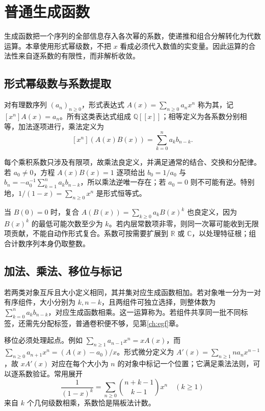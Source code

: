 \documentclass[UTF8,12pt,a4paper,fontset=fandol]{ctexbook}
\begin{document}
\chapter{普通生成函数}
\label{ch:ogf}

生成函数把一个序列的全部信息存入各次幂的系数，使递推和组合分解转化为代数运算。本章使用形式幂级数，不把 $x$ 看成必须代入数值的实变量。因此运算的合法性来自逐系数的有限性，而非解析收敛。

\section{形式幂级数与系数提取}

\begin{definition}
对有理数序列 $(a_n)_{n\ge0}$，形式表达式 $A(x)=\sum_{n\ge0}a_nx^n$ 称为其，记 $[x^n]A(x)=a_n$。所有这类表达式组成 $\mathbb Q[[x]]$；相等定义为各系数分别相等，加法逐项进行，乘法定义为
\[
 [x^n](A(x)B(x))=\sum_{k=0}^n a_kb_{n-k}.
\]
\end{definition}

每个乘积系数只涉及有限项，故乘法良定义，并满足通常的结合、交换和分配律。若 $a_0\ne0$，方程 $A(x)B(x)=1$ 逐项给出 $b_0=1/a_0$ 与 $b_n=-a_0^{-1}\sum_{k=1}^n a_kb_{n-k}$，所以乘法逆唯一存在；若 $a_0=0$ 则不可能有逆。特别地，$1/(1-x)=\sum_{n\ge0}x^n$ 是形式恒等式。

当 $B(0)=0$ 时，复合 $A(B(x))=\sum_{k\ge0}a_kB(x)^k$ 也良定义，因为 $B(x)^k$ 的最低可能次数至少为 $k$。若内层常数项非零，则同一次幂可能收到无限项贡献，不能自动作形式复合。系数可按需要扩展到 $\mathbb R$ 或 $\mathbb C$，以处理特征根；组合计数序列本身仍取整数。

\section{加法、乘法、移位与标记}

若两类对象互斥且大小定义相同，其并集对应生成函数相加。若对象唯一分为一对有序组件，大小分别为 $k,n-k$，且两组件可独立选择，则整体数为 $\sum_{k=0}^n a_kb_{n-k}$，对应生成函数相乘。这一运算称为。若组件共享同一批不同标签，还需先分配标签，普通卷积便不够，见第\ref{ch:egf}章。

移位必须处理起点。例如 $\sum_{n\ge1}a_{n-1}x^n=xA(x)$，而 $\sum_{n\ge0}a_{n+1}x^n=(A(x)-a_0)/x$。形式微分定义为 $A'(x)=\sum_{n\ge1}na_nx^{n-1}$，故 $xA'(x)$ 对应在每个大小为 $n$ 的对象中标记一个位置；它满足乘法法则，可以逐系数验证。常用展开
\begin{equation}
  \frac{1}{(1-x)^k}=\sum_{n\ge0}\binom{n+k-1}{k-1}x^n\quad(k\ge1)
  \label{eq:negative-binomial}
\end{equation}
来自 $k$ 个几何级数相乘，系数恰是隔板法计数。
\end{document}

